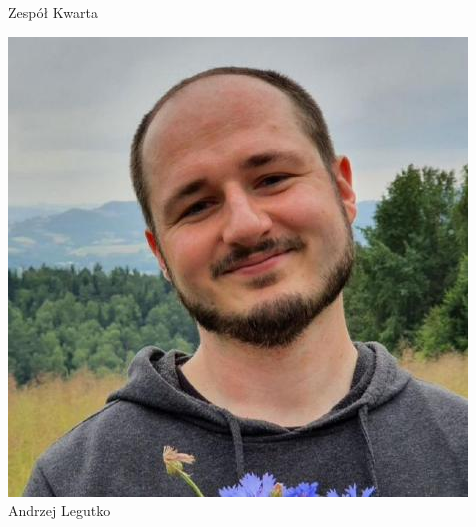 \begin{frame}[t]{Zespół Kwarta}
\begin{minipage}{0.22\linewidth}
\includegraphics[width=\linewidth]{img/AL}\\
\scriptsize Andrzej Legutko \\
\scriptsize {}
\end{minipage}
\end{frame}
